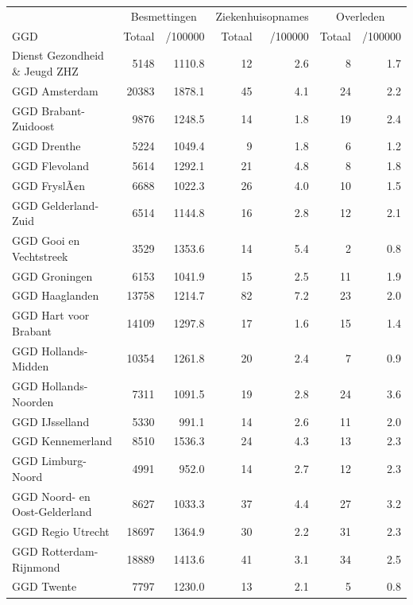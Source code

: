 \documentclass[
  english,
  man,floatsintext]{apa6}
\begin{document}
\begin{table}
\centering\begingroup\fontsize{10}{12}\selectfont

\begin{threeparttable}
\begin{tabular}{lrrrrrr}
\toprule
\multicolumn{1}{c}{ } & \multicolumn{2}{c}{Besmettingen} & \multicolumn{2}{c}{Ziekenhuisopnames} & \multicolumn{2}{c}{Overleden} \\
\cmidrule(l{3pt}r{3pt}){2-3} \cmidrule(l{3pt}r{3pt}){4-5} \cmidrule(l{3pt}r{3pt}){6-7}
GGD & Totaal & /100000 & Totaal & /100000 & Totaal & /100000\\
\midrule
Dienst Gezondheid \& Jeugd ZHZ & 5148 & 1110.8 & 12 & 2.6 & 8 & 1.7\\
GGD Amsterdam & 20383 & 1878.1 & 45 & 4.1 & 24 & 2.2\\
GGD Brabant-Zuidoost & 9876 & 1248.5 & 14 & 1.8 & 19 & 2.4\\
GGD Drenthe & 5224 & 1049.4 & 9 & 1.8 & 6 & 1.2\\
GGD Flevoland & 5614 & 1292.1 & 21 & 4.8 & 8 & 1.8\\
GGD FryslÃ¢n & 6688 & 1022.3 & 26 & 4.0 & 10 & 1.5\\
GGD Gelderland-Zuid & 6514 & 1144.8 & 16 & 2.8 & 12 & 2.1\\
GGD Gooi en Vechtstreek & 3529 & 1353.6 & 14 & 5.4 & 2 & 0.8\\
GGD Groningen & 6153 & 1041.9 & 15 & 2.5 & 11 & 1.9\\
GGD Haaglanden & 13758 & 1214.7 & 82 & 7.2 & 23 & 2.0\\
GGD Hart voor Brabant & 14109 & 1297.8 & 17 & 1.6 & 15 & 1.4\\
GGD Hollands-Midden & 10354 & 1261.8 & 20 & 2.4 & 7 & 0.9\\
GGD Hollands-Noorden & 7311 & 1091.5 & 19 & 2.8 & 24 & 3.6\\
GGD IJsselland & 5330 & 991.1 & 14 & 2.6 & 11 & 2.0\\
GGD Kennemerland & 8510 & 1536.3 & 24 & 4.3 & 13 & 2.3\\
GGD Limburg-Noord & 4991 & 952.0 & 14 & 2.7 & 12 & 2.3\\
GGD Noord- en Oost-Gelderland & 8627 & 1033.3 & 37 & 4.4 & 27 & 3.2\\
GGD Regio Utrecht & 18697 & 1364.9 & 30 & 2.2 & 31 & 2.3\\
GGD Rotterdam-Rijnmond & 18889 & 1413.6 & 41 & 3.1 & 34 & 2.5\\
GGD Twente & 7797 & 1230.0 & 13 & 2.1 & 5 & 0.8\\

\end{tabular}
\end{threeparttable}
\end{table}
\end{document}
